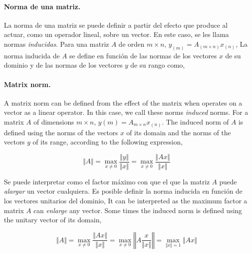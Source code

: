 \begin{paracol}{2}
\paragraph{Norma de una matriz.} La norma de una matriz se puede definir a partir del efecto que produce al actuar, como un operador lineal, sobre un vector. En este caso, se les llama normas \emph{inducidas}. Para una matriz $A$ de orden $m\times n$, $y_{(m)}=A_{(m\times n)}x_{(n)}$, La norma inducida de $A$ se define en función de las normas de los vectores $x$ de su dominio y de las normas de los vectores $y$ de su rango como,
\switchcolumn
\paragraph{Matrix norm.} A matrix norm can be defined from the effect of the matrix when operates  on a vector as a linear operator. In this case, we call these norms \emph{induced} norms. For a matrix $A$ of dimensions $m\times n$, $y(m) =A_{m\times n}x_{(n)}$. The induced norm of $A$ is defined using the norms of the vectors $x$ of its domain and the norms of the vectors $y$ of its range, according to the following expression,   
\end{paracol}
\begin{equation*}
\Vert A \Vert =\max_{x \neq 0} \frac{\Vert y \Vert}{\Vert x \Vert}=\max_{x \neq 0} \frac{\Vert Ax \Vert}{\Vert x \Vert}
\end{equation*}

\begin{paracol}{2}
Se puede interpretar como el factor máximo con que el que la matriz $A$ puede \emph{alargar} un vector cualquiera. Es posible definir la norma inducida en función de los vectores unitarios del dominio,
\switchcolumn
It can be interpreted as the maximum factor a matrix $A$ can \emph{enlarge} any vector. Some times the induced norm is defined using the unitary vector of its domain,

\end{paracol}
\begin{equation*}
\Vert A \Vert =\max_{x \neq 0} \frac{\Vert Ax \Vert}{\Vert x \Vert}= \max_{x \neq 0} \left\Vert A\frac{x}{\Vert x \Vert} \right\Vert= \max_{\Vert x \Vert =1}\Vert Ax \Vert
\end{equation*}

